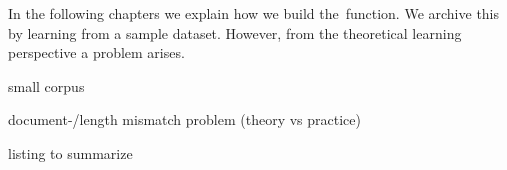In the following chapters we explain how we build the~\nto function.
We archive this by learning from a sample dataset. 
However, from the theoretical learning perspective a problem arises.


small corpus

document-/length mismatch problem (theory vs practice)

listing to summarize


